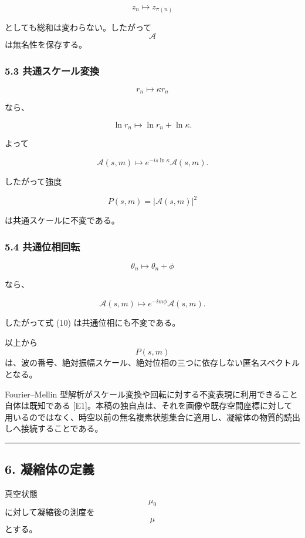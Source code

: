 \documentclass[
  a4paper,
]{ltjsarticle}
\begin{document}
\[
z_n\mapsto z_{\pi(n)}
\]

としても総和は変わらない。したがって \[\mathcal A\] は無名性を保存する。

\subsubsection{5.3
共通スケール変換}\label{ux5171ux901aux30b9ux30b1ux30fcux30ebux5909ux63db}

\[
r_n
\mapsto
\kappa r_n
\]

なら、

\[
\ln r_n
\mapsto
\ln r_n+\ln\kappa.
\]

よって

\[
\mathcal A(s,m)
\mapsto
 e^{-is\ln\kappa}
\mathcal A(s,m).
\tag{9}
\]

したがって強度

\[
\boxed{
P(s,m)
=
|\mathcal A(s,m)|^2
}
\tag{10}
\]

は共通スケールに不変である。

\subsubsection{5.4
共通位相回転}\label{ux5171ux901aux4f4dux76f8ux56deux8ee2}

\[
\theta_n
\mapsto
\theta_n+\phi
\]

なら、

\[
\mathcal A(s,m)
\mapsto
 e^{-im\phi}
\mathcal A(s,m).
\tag{11}
\]

したがって式 (10) は共通位相にも不変である。

以上から \[P(s,m)\]
は、波の番号、絶対振幅スケール、絶対位相の三つに依存しない匿名スペクトルとなる。

Fourier--Mellin
型解析がスケール変換や回転に対する不変表現に利用できること自体は既知である
{[}E1{]}。本稿の独自点は、それを画像や既存空間座標に対して用いるのではなく、時空以前の無名複素状態集合に適用し、凝縮体の物質的読出しへ接続することである。

\begin{center}\rule{0.5\linewidth}{0.5pt}\end{center}

\subsection{6. 凝縮体の定義}\label{ux51ddux7e2eux4f53ux306eux5b9aux7fa9}

真空状態 \[\mu_0\] に対して凝縮後の測度を \[\mu\] とする。
\end{document}
